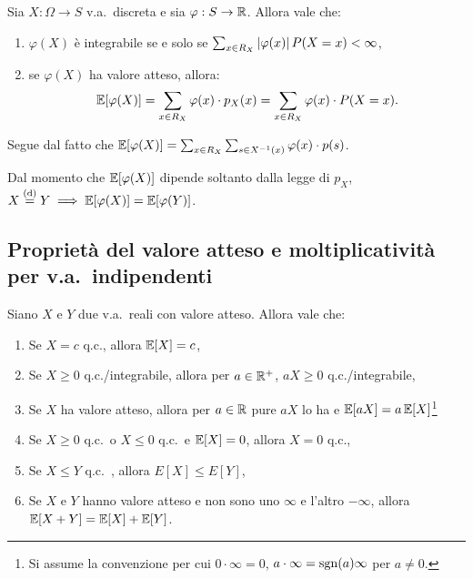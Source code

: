 \begin{multicols*}{2}
\begin{proposition}
    Sia $X : \Omega \to S$ v.a.~discreta e sia $\varphi : S \to \mathbb{R}$. Allora vale che:
    \begin{enumerate}[(i.)]
        \item $\varphi(X)$ è integrabile se e solo se $\sum_{x \in R_X} \left\lvert \varphi(x) \right\rvert P(X = x) < \infty$,
        \item se $\varphi(X)$ ha valore atteso, allora:
        \[
            \mathbb{E}[\varphi(X)] = \sum_{x \in R_X} \varphi(x) \cdot p_X(x) = \sum_{x \in R_X} \varphi(x) \cdot P(X = x).
        \]
    \end{enumerate}
    Segue dal fatto che $\mathbb{E}[\varphi(X)] = \sum_{x \in R_X} \sum_{s \in X^{-1}(x)} \varphi(x) \cdot p(s)$.
\end{proposition}

\begin{remark}
    Dal momento che $\mathbb{E}[\varphi(X)]$ dipende soltanto dalla legge di $p_X$,
    $X \overset{\mathrm{(d)}}{=} Y \implies \mathbb{E}[\varphi(X)] = \mathbb{E}[\varphi(Y)]$.
\end{remark}

\subsection{Proprietà del valore atteso e moltiplicatività per v.a.~indipendenti}

\begin{proposition}
    \label{prop:prop_valore_atteso}
    Siano $X$ e $Y$ due v.a.~reali con valore atteso. Allora vale che:
    \begin{enumerate}[(i.)]
        \item Se $X=c$ q.c., allora $\mathbb{E}[X] = c$,
        \item Se $X \geq 0$ q.c./integrabile, allora per $a \in \mathbb{R}^+$, $aX \geq 0$ q.c./integrabile,
        \item Se $X$ ha valore atteso, allora per $a \in \mathbb{R}$ pure $aX$ lo ha e $\mathbb{E}[aX] = a \, \mathbb{E}[X]$\footnote{
            Si assume la convenzione per cui $0 \cdot \infty = 0$, $a \cdot \infty = \operatorname{sgn}(a) \infty$ per
            $a \neq 0$.
        }
        \item Se $X \geq 0$ q.c.~o $X \leq 0$ q.c.~e $\mathbb{E}[X] = 0$, allora $X = 0$ q.c.,
        \item Se $X \leq Y$ q.c.~, allora $E[X] \leq E[Y]$,
        \item Se $X$ e $Y$ hanno valore atteso e non sono uno $\infty$ e l'altro
        $-\infty$, allora $\mathbb{E}[X + Y] = \mathbb{E}[X] + \mathbb{E}[Y]$.
    \end{enumerate}
\end{proposition}


\end{multicols*}
